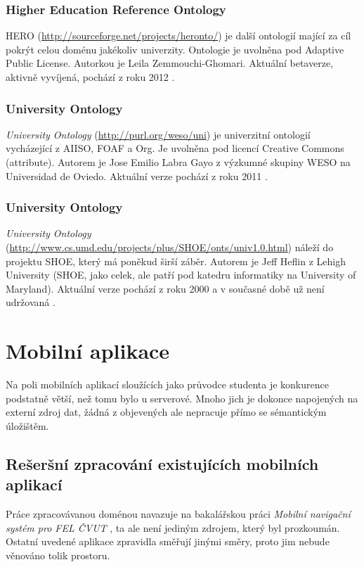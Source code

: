 \subsubsection{Higher Education Reference Ontology}
\Gls{HERO} (\url{http://sourceforge.net/projects/heronto/}) je další ontologií mající za cíl pokrýt celou doménu jakékoliv univerzity. Ontologie je uvolněna pod Adaptive Public License. Autorkou je Leila Zemmouchi-Ghomari. Aktuální betaverze, aktivně vyvíjená, pochází z roku 2012 \cite{Hero}.

\subsubsection{University Ontology}
\emph{University Ontology} (\url{http://purl.org/weso/uni}) je univerzitní ontologií vycházející z \gls{AIISO}, \gls{FOAF} a \gls{Org}. Je uvolněna pod licencí Creative Commons (attribute). Autorem je Jose Emilio Labra Gayo z výzkumné skupiny WESO na Universidad de Oviedo. Aktuální verze pochází z roku 2011 \cite{Weso}.

\subsubsection{University Ontology}
\emph{University Ontology} (\url{http://www.cs.umd.edu/projects/plus/SHOE/onts/univ1.0.html}) náleží do projektu \gls{SHOE}, který má poněkud širší záběr. Autorem je Jeff Heflin z Lehigh University (\gls{SHOE}, jako celek, ale patří pod katedru informatiky na University of Maryland). Aktuální verze pochází z roku 2000 a v současné době už není udržovaná \cite{Shoe}.


\section{Mobilní aplikace}
Na poli mobilních aplikací sloužících jako průvodce studenta je konkurence podstatně větší, než tomu bylo u serverové. Mnoho jich je dokonce napojených na externí zdroj dat, žádná z objevených ale nepracuje přímo se sémantickým úložištěm.

\subsection{Rešeršní zpracování existujících mobilních aplikací}
Práce zpracovávanou doménou navazuje na bakalářskou práci \textit{Mobilní navigační systém pro FEL ČVUT} \cite{Bakalarka}, ta ale není jediným zdrojem, který byl prozkoumán. Ostatní uvedené aplikace zpravidla směřují jinými směry, proto jim nebude věnováno tolik prostoru.

